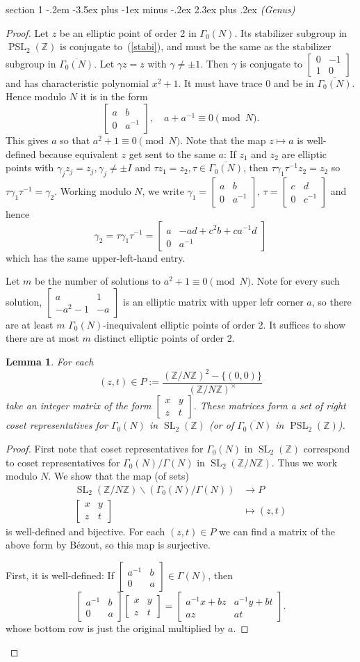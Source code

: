 \documentclass[12pt]{article}
\makeatletter
\theoremstyle{norm}
\newtheorem{lem}[thm]{Lemma}
\newcommand{\Z}[0]{\mathbb{Z}}
\newcommand{\ga}[0]{\gamma}
\newcommand{\Ga}[0]{\Gamma}
\newcommand{\PSL}{\operatorname{PSL}}
\newcommand{\SL}{\operatorname{SL}}
\newcommand{\bs}[0]{\backslash}
\newcommand{\ol}[1]{\overline{#1}}
\newcommand{\matt}[4]{
\left[
\begin{matrix}
{#1}&{#2}\\
{#3}&{#4}
\end{matrix}
\right]}
\newcommand{\smatt}[4]{
\left[
\begin{smallmatrix}
{#1}&{#2}\\
{#3}&{#4}
\end{smallmatrix}
\right]}
\newenvironment{problem}{\@startsection
       {section}
       {1}
       {-.2em}
       {-3.5ex plus -1ex minus -.2ex}
       {2.3ex plus .2ex}
       {\pagebreak[3]%
       \large\bf\noindent{Problem }
       }
       }
       {%
       }
\makeatother
\begin{document}
\begin{problem}{\it (Genus)}
\begin{proof}
Let $z$ be an elliptic point of order 2 in $\Ga_0(N)$. Its stabilizer subgroup in $\PSL_2(\Z)$ is conjugate to~(\ref{stabi}), and must be the same as the stabilizer subgroup in $\overline{\Ga_0(N)}$. 
Let $\ga z=z$ with $\ga\neq \pm 1$. Then $\ga$ is conjugate to $\smatt 0{-1}{1}0$ and has characteristic polynomial $x^2+1$. It must have trace 0 and be in $\overline{\Ga_0(N)}$. Hence modulo $N$ it is in the form
\begin{equation}\label{formofmat}
\matt ab0{a^{-1}},\quad a+a^{-1}\equiv 0\pmod N.
\end{equation}
This gives $a$ so that $a^2+1\equiv 0\pmod N$.
Note that the map $z\mapsto a$ is well-defined because equivalent $z$ get sent to the same $a$: If $z_1$ and $z_2$ are elliptic points with $\ga_jz_j=z_j,\ga_j\neq \pm I$ and $\tau z_1 =z_2,\tau\in \ol{\Ga_0(N)}$, 
then $\tau \ga_1\tau^{-1}z_2=z_2$ so $\tau \ga_1\tau^{-1}=\ga_2$. Working modulo $N$, we write $\ga_1=\smatt ab0{a^{-1}}$, $\tau=\smatt cd0{c^{-1}}$ and hence
\[
\ga_2=\tau \ga_1\tau^{-1}=\matt a{-ad+c^2b+ca^{-1}d}0{a^{-1}}
\]
which has the same upper-left-hand entry.

Let $m$ be the number of solutions to $a^2+1\equiv 0\pmod N$. Note for every such solution, $\smatt a{1}{-a^2-1}{-a}$ is an elliptic matrix with upper lefr corner $a$, so there are at least $m$ $\Ga_0(N)$-inequivalent elliptic points of order 2.
It suffices to show there are at most $m$ distinct elliptic points of order 2.
\begin{lem}
For each
\[(z,t)\in P:=\frac{(\Z/N\Z)^2-\{(0,0)\}}{(\Z/N\Z)^{\times}}\]
take an integer matrix of the form
$\smatt xyzt$. These matrices
form a set of right coset representatives for ${\Ga_0(N)}$ in $\SL_2(\Z)$ (or of $\overline{\Ga_0(N)}$ in $\PSL_2(\Z)$). 
\end{lem}
\begin{proof}
First note that coset representatives for ${\Ga_0(N)}$ in $\SL_2(\Z)$ correspond to coset representatives for ${\Ga_0(N)}/{\Ga(N)}$ in $\SL_2(\Z/N\Z)$. Thus we work modulo $N$.
We show that the map (of sets)
\begin{align*}
\SL_2(\Z/N\Z)\bs (\Ga_0(N)/\Ga(N))&\to P\\
\matt xyzt&\mapsto(z,t)
\end{align*}
is well-defined and bijective. For each $(z,t)\in P$ we can find a matrix of the above form by B\'ezout, so this map is surjective.

First, it is well-defined: If $\smatt {a^{-1}}b0{a}\in \Ga(N)$, then 
\begin{equation}\label{checkcoset}
\matt {a^{-1}}b0{a}
\matt xyzt=\matt {a^{-1}x+bz}{a^{-1}y+bt}{az}{at}.
\end{equation}
whose bottom row is just the original multiplied by $a$.


\end{proof}
\end{proof}
\end{problem}
\end{document}
